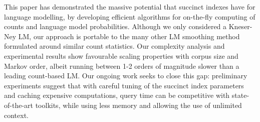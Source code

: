 This paper has demonstrated the massive potential that succinct indexes have for language modelling, by developing efficient algorithms for on-the-fly computing of \ngram counts and language model probabilities.
Although we only considered a Kneser-Ney LM, our approach is portable to the many other LM smoothing method formulated around similar count statistics.
Our complexity analysis and experimental results show favourable scaling properties with corpus size and Markov order, albeit running between 1-2 orders of magnitude slower than a leading count-based LM.
Our ongoing work seeks to close this gap: preliminary experiments suggest that with careful tuning of the succinct index parameters and caching expensive computations, query time can be competitive with state-of-the-art toolkits, while using less memory and allowing the use of unlimited context.

